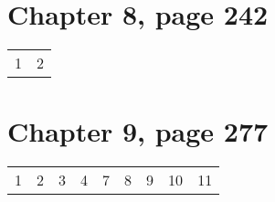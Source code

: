 \documentclass[10pt,english]{article}
\begin{document}
\section*{Chapter 8, page 242}
\label{sec-5}


\begin{center}
\begin{tabular}{rr}
 1  &  2  \\
\end{tabular}
\end{center}
\section*{Chapter 9, page 277}
\label{sec-6}


\begin{center}
\begin{tabular}{rrrrrrrrr}
 1  &  2  &  3  &  4  &  7  &  8  &  9  &  10  &  11  \\
\end{tabular}
\end{center}
\end{document}

